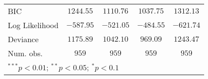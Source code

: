 \begin{table}
\begin{center}
\begin{tabular}{l c c c c}
BIC            & $1244.55$     & $1110.76$     & $1037.75$     & $1312.13$     \\
Log Likelihood & $-587.95$     & $-521.05$     & $-484.55$     & $-621.74$     \\
Deviance       & $1175.89$     & $1042.10$     & $969.09$      & $1243.47$     \\
Num. obs.      & $959$         & $959$         & $959$         & $959$         \\
\bottomrule
\multicolumn{5}{l}{\scriptsize{$^{***}p<0.01$; $^{**}p<0.05$; $^{*}p<0.1$}}
\end{tabular}
\label{tab_emo_glm}
\end{center}
\end{table}
